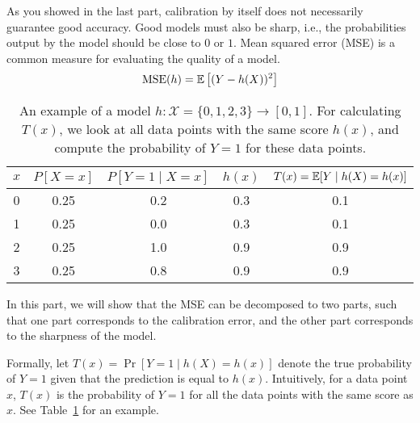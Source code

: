 \item[(b)] 
As you showed in the last part, calibration  by  itself  does  not necessarily guarantee good accuracy. 
Good models must also be sharp, i.e., the probabilities output by the model should be close to $0$ or $1$. 
Mean squared error (MSE) is a common measure for evaluating the quality of a model.
\begin{align}
	\text{MSE}(h) = \mathbb{E} \left[(Y-h(X))^2\right]
\end{align}

\begin{table}
	\centering
	\begin{tabular}{ccccc} \toprule
		$x$&$P[X=x]$&$P[Y=1 \mid X=x]$&$h(x)$&$T(x)=\mathbb{E} [Y \mid h(X)=h(x)]$\\ \midrule
		0&0.25&0.2&0.3&0.1\\
		1&0.25&0.0&0.3&0.1\\
		2&0.25&1.0&0.9&0.9\\ 
		3&0.25&0.8&0.9&0.9\\ \bottomrule
	\end{tabular}
	\caption{\label{tab:t-example} An example of a model $h : \mathcal{X}=\{0,1,2,3\} \rightarrow [0,1]$.  
		For calculating $T(x)$, we look at all data points with the same score $h(x)$, and compute the probability of $Y=1$ for these data points.}
\end{table}



In this part, we will show that the MSE can be decomposed to two parts, such that one part corresponds to the calibration error, and the other part corresponds to the sharpness of the model.


Formally, let $T(x) = \Pr [Y =1 \mid h(X) = h(x)]$ denote the true probability of $Y=1$ given that the prediction is equal to $h(x)$.
Intuitively, for a data point $x$, $T(x)$ is the probability of $Y=1$ for all the data points with the same score as $x$. See Table~\ref{tab:t-example} for an example.


